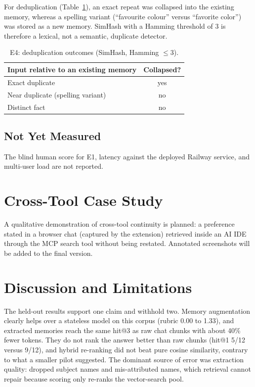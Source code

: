 \documentclass[conference]{IEEEtran}
\begin{document}
For deduplication (Table~\ref{tab:dedup}), an exact repeat was collapsed into the
existing memory, whereas a spelling variant (``favourite colour'' versus
``favorite color'') was stored as a new memory. SimHash with a Hamming threshold
of 3 is therefore a lexical, not a semantic, duplicate detector.

\begin{table}[t]
\caption{E4: deduplication outcomes (SimHash, Hamming $\le 3$).}
\label{tab:dedup}
\centering\footnotesize
\begin{tabular}{@{}lc@{}}
\toprule
Input relative to an existing memory & Collapsed? \\
\midrule
Exact duplicate & yes \\
Near duplicate (spelling variant) & no \\
Distinct fact & no \\
\bottomrule
\end{tabular}
\end{table}

\subsection{Not Yet Measured}
The blind human score for E1, latency against the deployed Railway service, and
multi-user load are not reported.

\section{Cross-Tool Case Study}\label{sec:casestudy}
A qualitative demonstration of cross-tool continuity is planned: a preference
stated in a browser chat (captured by the extension) retrieved inside an AI IDE
through the MCP search tool without being restated. Annotated screenshots will
be added to the final version.

\section{Discussion and Limitations}\label{sec:discussion}
The held-out results support one claim and withhold two. Memory augmentation
clearly helps over a stateless model on this corpus (rubric 0.00 to 1.33), and
extracted memories reach the same hit@3 as raw chat chunks with about 40\% fewer
tokens. They do not rank the answer better than raw chunks (hit@1 5/12 versus
9/12), and hybrid re-ranking did not beat pure cosine similarity, contrary to what
a smaller pilot suggested. The dominant source of error was extraction quality:
dropped subject names and mis-attributed names, which retrieval cannot repair
because scoring only re-ranks the vector-search pool.
\end{document}
